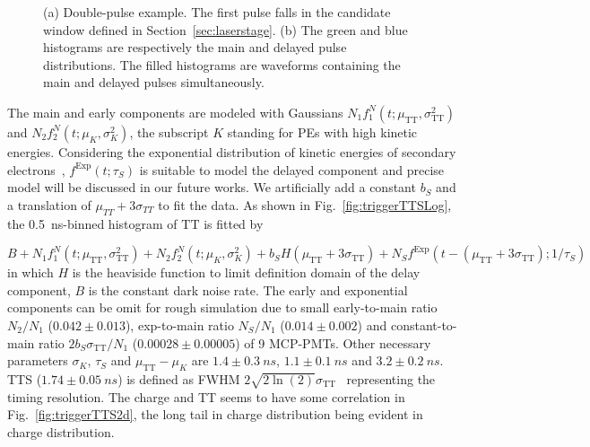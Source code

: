 \begin{figure}[!htbp]
\begin{subfigure}[t]{\SF\textwidth}
        \caption{}%
        \label{fig:triggerTTlatepulse}
    \end{subfigure}
    \caption{(a) Double-pulse example. The first pulse falls in the candidate window defined in Section~\ref{sec:laserstage}. (b) The green and blue histograms are respectively the main and delayed pulse distributions. The filled histograms are waveforms containing the main and delayed pulses simultaneously.}
\end{figure}

The main and early components are modeled with Gaussians $N_1f_1^N(t;\mu_{\mathrm{TT}},\sigma_{\mathrm{TT}}^2)$ and $N_2f_2^N(t;\mu_K,\sigma_K^2)$, the subscript $K$ standing for PEs with high kinetic energies. Considering the exponential distribution of kinetic energies of secondary electrons~\cite{Furman,SecondElectron}, $f^\mathrm{Exp}(t;\tau_S)$ is suitable to model the delayed component and precise model will be discussed in our future works.  We artificially add a constant $b_S$ and a translation of $\mu_{TT} + 3\sigma_{TT}$ to fit the data. As shown in Fig.~\ref{fig:triggerTTSLog}, the \SI{0.5}{ns}-binned histogram of $\mathrm{TT}$ is fitted by

\begin{equation}
    B+N_1f_1^N(t;\mu_{\mathrm{TT}},\sigma_{\mathrm{TT}}^2)+N_2f_2^N(t;\mu_K,\sigma_K^2)+b_SH(\mu_{\mathrm{TT}}+3\sigma_{\mathrm{TT}})+N_Sf^{\mathrm{Exp}}(t-(\mu_{\mathrm{TT}}+3\sigma_{\mathrm{TT}});1/\tau_S)
\end{equation}
in which $H$ is the heaviside function to limit definition domain of the delay component, $B$ is the constant dark noise rate. The early and exponential components can be omit for rough simulation due to small early-to-main ratio $N_2/N_1$ ($0.042\pm0.013$), exp-to-main ratio $N_S/N_1$ ($0.014\pm0.002$) and constant-to-main ratio $2b_S\sigma_{\mathrm{TT}}/N_1$ ($0.00028\pm0.00005$) of 9 MCP-PMTs. Other necessary parameters $\sigma_K$, $\tau_S$ and $\mu_{\mathrm{TT}}-\mu_K$ are $1.4\pm\SI{0.3}{ns}$, $1.1\pm\SI{0.1}{ns}$ and $3.2\pm\SI{0.2}{ns}$. TTS ($1.74\pm\SI{0.05}{ns}$) is defined as FWHM $2\sqrt{2\ln(2)}\sigma_{\mathrm{TT}}$~\cite{HAMAMATSUManual} representing the timing resolution. The charge and TT seems to have some correlation in Fig.~\ref{fig:triggerTTS2d}, the long tail in charge distribution being evident in charge distribution.

